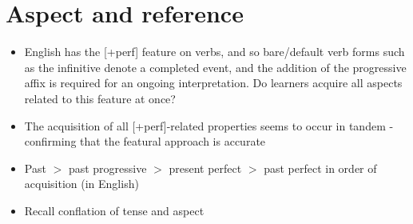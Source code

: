 \documentclass{article}
\begin{document}
\section{Aspect and reference}
\begin{itemize}
    \item English has the [+perf] feature on verbs, and so bare/default verb forms such as the infinitive denote a completed event, and the addition of the progressive affix is required for an ongoing interpretation. Do learners acquire all aspects related to this feature at once?
    \item The acquisition of all [+perf]-related properties seems to occur in tandem - confirming that the featural approach is accurate 
    \item Past $>$ past progressive $>$ present perfect $>$ past perfect in order of acquisition (in English)
    \item Recall conflation of tense and aspect

\end{itemize}
\end{document}
